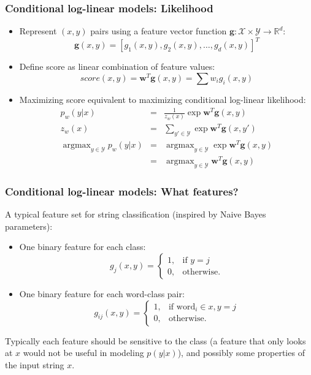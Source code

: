\documentclass[ignorenonframetext,plain]{beamer}
\DeclareMathOperator*{\argmax}{argmax}
\newcommand{\score}{\mathit{score}}
\begin{document}
\begin{frame}\frametitle{Conditional log-linear models: Likelihood}
\begin{itemize}
\item Represent $(x, y)$ pairs using a feature vector function
  $\mathbf{g}: \mathcal{X} \times \mathcal{Y} \rightarrow
  \mathbb{R}^d:$ \[
\mathbf{g}(x, y) = [ g_1(x, y), g_2(x, y), \dots, g_d(x, y) ]^T
\]
\item Define score as linear combination of feature values: \[
  \score(x, y) = \mathbf{w}^T \mathbf{g}(x, y) = \sum w_i g_i(x, y)
\]
\item Maximizing score equivalent to maximizing conditional log-linear
  likelihood:
\begin{eqnarray*}
  p_w(y|x) &=& \frac{1}{z_w(x)}\exp \mathbf{w}^T \mathbf{g}(x, y) \\
  z_w(x) &=& \sum_{y'\in\mathcal{Y}} \exp \mathbf{w}^T \mathbf{g}(x, y') \\
  \argmax_{y\in\mathcal{Y}} p_w(y|x)
    &=& \argmax_{y\in\mathcal{Y}} \exp \mathbf{w}^T \mathbf{g}(x, y) \\
    &=& \argmax_{y\in\mathcal{Y}} \mathbf{w}^T \mathbf{g}(x, y)
\end{eqnarray*}
\end{itemize}
\end{frame}

\begin{frame}\frametitle{Conditional log-linear models: What features?}
A typical feature set for string classification (inspired by Naive
Bayes parameters):\begin{itemize}
\item One binary feature for each class:\[
g_j(x, y) = 
\begin{cases}
1,& \text{if } y=j \\
0,& \text{otherwise.}
\end{cases}
\]
\item One binary feature for each word-class pair:\[
g_{ij}(x, y) = 
\begin{cases}
1,& \text{if word}_i\in x, y=j \\
0,& \text{otherwise.}
\end{cases}
\]
\end{itemize}
Typically each feature should be sensitive to the class (a feature
that only looks at $x$ would not be useful in modeling $p(y|x)$), and
possibly some properties of the input string $x$.
\end{frame}
\end{document}
